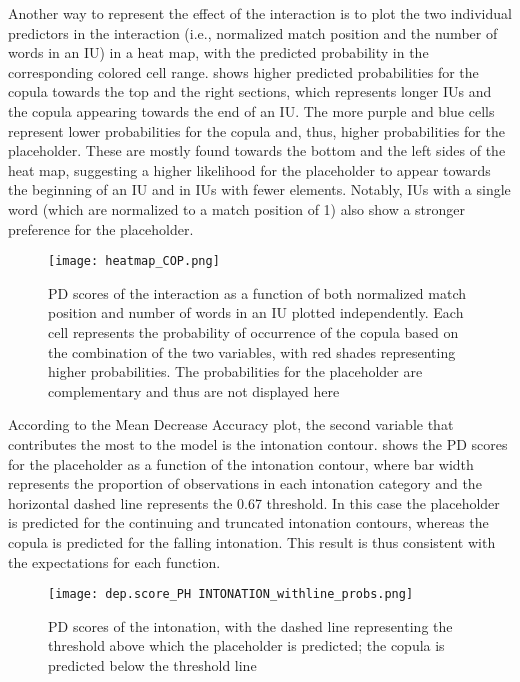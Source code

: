 \documentclass[output=paper,colorlinks,citecolor=brown
\ChapterDOI{10.5281/zenodo.15697581}
]{langscibook}
\begin{document}
\newpage
Another way to represent the effect of the interaction is to plot the two individual predictors in the interaction (i.e., normalized match position and the number of words in an IU) in a heat map, with the predicted probability in the corresponding colored cell range.
 shows higher predicted probabilities for the copula towards the top and the right sections, which represents longer IUs and the copula appearing towards the end of an IU.
The more purple and blue cells represent lower probabilities for the copula and, thus, higher probabilities for the placeholder.
These are mostly found towards the bottom and the left sides of the heat map, suggesting a higher likelihood for the placeholder to appear towards the beginning of an IU and in IUs with fewer elements.
Notably, IUs with a single word (which are normalized to a match position of 1) also show a stronger preference for the placeholder. 

\begin{figure}
    \centering
    \texttt{[image: heatmap\_COP.png]}
    \caption{PD scores of the interaction as a function of both normalized match position and number of words in an IU plotted independently. Each cell represents the probability of occurrence of the copula based on the combination of the two variables, with red shades representing higher probabilities. The probabilities for the placeholder are complementary and thus are not displayed here}
    \label{fig:heatmap}
\end{figure}


According to the Mean Decrease Accuracy plot, the second variable that contributes the most to the model is the intonation contour. 
 shows the PD scores for the placeholder as a function of the intonation contour, where bar width represents the proportion of observations in each intonation category and the horizontal dashed line represents the 0.67 threshold.
In this case the placeholder is predicted for the continuing and truncated intonation contours, whereas the copula is predicted for the falling intonation.  
This result is thus consistent with the expectations for each function. 


\begin{figure}
    \centering
    \texttt{[image: dep.score\_PH~INTONATION\_withline\_probs.png]}
    \caption{PD scores of the intonation, with the dashed line representing the threshold above which the placeholder is predicted; the copula is predicted below the threshold line}
    \label{fig:dp.ph.inton}
\end{figure}
\end{document}
